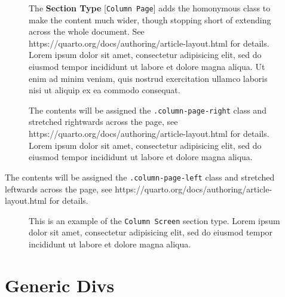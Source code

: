 \documentclass[
  12pt,
  a4paper,
  oneside,
  numbers=noenddot,
  titlepage,
  toclink=all,
  toc=bibliography]{scrbook}
\theoremstyle{definition}
\theoremstyle{definition}
\theoremstyle{definition}
\theoremstyle{plain}
\theoremstyle{plain}
\theoremstyle{plain}
\theoremstyle{plain}
\theoremstyle{plain}
\theoremstyle{remark}
\begin{document}
\hypertarget{scriv60}{}
\begin{figure}

The \textbf{Section Type }{[}\texttt{Column\ Page}{]} adds the
homonymous class to make the content much wider, though stopping short
of extending across the whole document. See
https://quarto.org/docs/authoring/article-layout.html for details. Lorem
ipsum dolor sit amet, consectetur adipisicing elit, sed do eiusmod
tempor incididunt ut labore et dolore magna aliqua. Ut enim ad minim
veniam, quis nostrud exercitation ullamco laboris nisi ut aliquip ex ea
commodo consequat.

\end{figure}

\hypertarget{scriv61}{}
\begin{figure}

The contents will be assigned the \texttt{.column-page-right} class and
stretched rightwards across the page, see
https://quarto.org/docs/authoring/article-layout.html for details. Lorem
ipsum dolor sit amet, consectetur adipisicing elit, sed do eiusmod
tempor incididunt ut labore et dolore magna aliqua.

\end{figure}

\leavevmode{}%
The contents will be assigned the \texttt{.column-page-left} class and
stretched leftwards across the page, see
https://quarto.org/docs/authoring/article-layout.html for details.

\hypertarget{scriv63}{}
\begin{figure}

This is an example of the \texttt{Column\ Screen} section type. Lorem
ipsum dolor sit amet, consectetur adipisicing elit, sed do eiusmod
tempor incididunt ut labore et dolore magna aliqua.

\end{figure}

\hypertarget{scriv64}{}

\hypertarget{sec-scriv65}{%
\section{Generic Divs}\label{sec-scriv65}}
\end{document}
